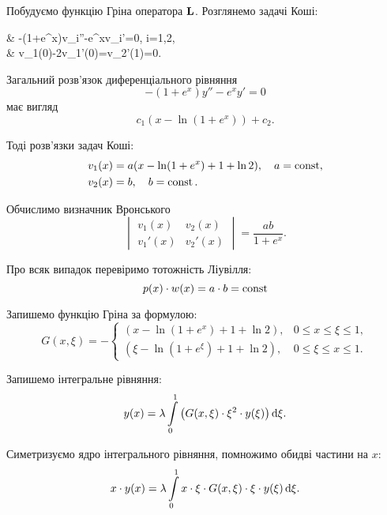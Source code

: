 \begin{solution}
	Побудуємо функцію Гріна оператора $\bf{L}$. Розглянемо задачі Коші:
	\begin{system*}
		& -(1+e^x)v_i''-e^xv_i'=0, \quad i=1,2,\\
		& v_1(0)-2v_1'(0)=v_2'(1)=0.
	\end{system*}

	Загальний розв'язок диференціального рівняння
	\begin{equation*}
		-(1+e^x)y''-e^xy'=0
	\end{equation*}
	має вигляд
	\begin{equation*}
		c_1(x-\ln(1+e^x))+c_2.
	\end{equation*}

	Тоді розв'язки задач Коші:
	\begin{align*}
		v_1(x) &= a(x - \ln(1+e^x)+1+\ln2), \quad a = \const,\\
		v_2(x) &= b, \quad b = \const.
	\end{align*}

	Обчислимо визначник Вронського
	\begin{equation*}
		\begin{vmatrix} v_1(x) & v_2(x) \\ v_1'(x) & v_2'(x) \end{vmatrix} = \frac{ab}{1+e^x}.
	\end{equation*}

	Про всяк випадок перевіримо тотожність Ліувілля:
	\begin{equation*}
		p(x)\cdot w(x) = a\cdot b = \const
	\end{equation*}

	Запишемо функцію Гріна за формулою:
	\begin{equation*}
		G(x, \xi) = - \begin{cases} (x-\ln(1+e^x)+1+\ln2), & 0\le x \le \xi \le 1, \\ (\xi-\ln(1+e^\xi)+1+\ln2), & 0\le \xi \le x \le 1. \end{cases}
	\end{equation*}

	Запишемо інтегральне рівняння:
	\begin{equation*}
		y(x) = \lambda \Int_0^1 \left(G(x,\xi)\cdot\xi^2\cdot y(\xi)\right)\diff\xi.
	\end{equation*}

	Симетризуємо ядро інтегрального рівняння, помножимо обидві частини на $x$:
	\begin{equation*}
		x \cdot y(x) = \lambda \Int_0^1 x \cdot \xi \cdot G(x, \xi) \cdot \xi \cdot y(\xi) \diff \xi.
	\end{equation*}


\end{solution}
